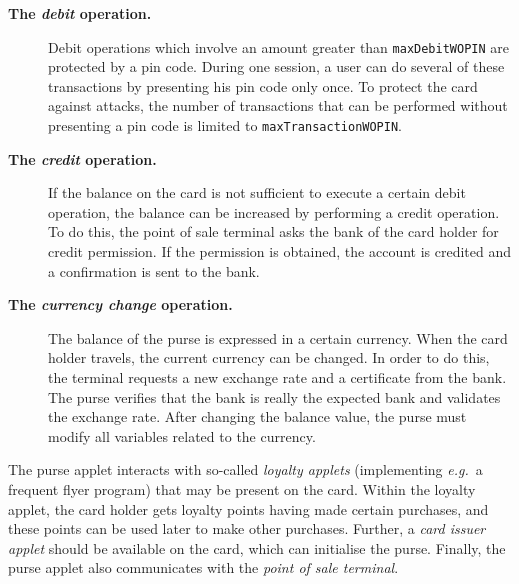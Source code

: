 \documentclass[a4paper]{llncs}
\begin{document}
\begin{description}
\item [\bf The \textit{debit} operation.]
Debit operations which involve an amount greater than
\texttt{maxDebitWOPIN} are protected by a pin code. During one session, 
a user can do several of these transactions by presenting his pin code
only once. To protect the card against attacks, the number of
transactions that can be performed without presenting a pin code is
limited to \texttt{maxTransactionWOPIN}.
\\


\item[\bf The \textit{credit} operation.]
If the balance on the card is not sufficient to execute a certain
debit operation, the balance can be increased by performing a credit
operation. To do this, the point of sale terminal asks the bank of the
card holder for credit permission. If the permission is obtained, the
account is credited and a confirmation is sent to the bank.
\\
\item [\bf The \textit{currency change} operation.]
The balance
of the purse is expressed in a certain currency. When the card holder
travels, the current currency can be changed. In order to do this, the
terminal requests a new exchange rate and a certificate from the
bank. The purse verifies that the bank is really the expected bank and
validates the exchange rate. After changing the balance value, the
purse must modify all variables related to the currency. 
\end{description}
The purse applet interacts with so-called \textit{loyalty applets}
(implementing \emph{e.g.}~a frequent flyer program) that may be
present on the card. Within the loyalty applet, the card holder gets
loyalty points having made certain purchases, and these points can be
used later to make other purchases. Further, a \textit{card issuer
applet} should be available on the card, which can initialise the
purse. Finally, the purse applet also communicates with the 
\emph{point of sale terminal}. 
\end{document}
